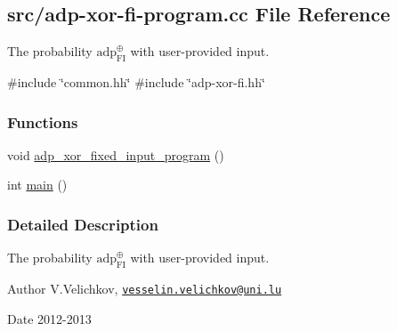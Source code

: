 \hypertarget{adp-xor-fi-program_8cc}{\subsection{src/adp-\/xor-\/fi-\/program.cc \-File \-Reference}
\label{adp-xor-fi-program_8cc}
}


\-The probability $\mathrm{adp}^{\oplus}_{\mathrm{FI}}$ with user-\/provided input.  


{\ttfamily \#include \char`\"{}common.\-hh\char`\"{}}\*
{\ttfamily \#include \char`\"{}adp-\/xor-\/fi.\-hh\char`\"{}}\*
\subsubsection*{\-Functions}
\begin{DoxyCompactItemize}
\item 
void \hyperlink{adp-xor-fi-program_8cc_a592a8c3ff4a775e3531b9602f2c1af1a}{adp\-\_\-xor\-\_\-fixed\-\_\-input\-\_\-program} ()
\item 
int \hyperlink{adp-xor-fi-program_8cc_ae66f6b31b5ad750f1fe042a706a4e3d4}{main} ()
\end{DoxyCompactItemize}


\subsubsection{\-Detailed \-Description}
\-The probability $\mathrm{adp}^{\oplus}_{\mathrm{FI}}$ with user-\/provided input. \begin{DoxyAuthor}{\-Author}
\-V.\-Velichkov, \href{mailto:vesselin.velichkov@uni.lu}{\tt vesselin.\-velichkov@uni.\-lu} 
\end{DoxyAuthor}
\begin{DoxyDate}{\-Date}
2012-\/2013 
\end{DoxyDate}


